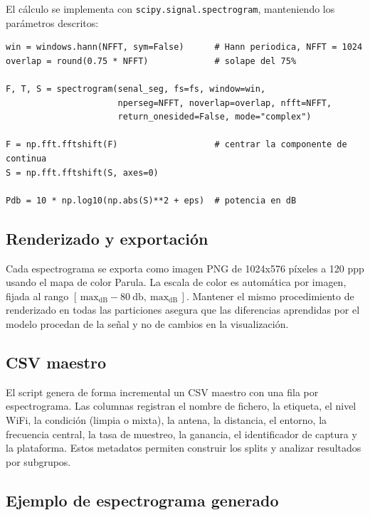 El cálculo se implementa con \texttt{scipy.signal.spectrogram}, manteniendo los parámetros descritos:

\begin{lstlisting}[style=python,caption={Cálculo de la STFT de cada segmento.}]
win = windows.hann(NFFT, sym=False)      # Hann periodica, NFFT = 1024
overlap = round(0.75 * NFFT)             # solape del 75%

F, T, S = spectrogram(senal_seg, fs=fs, window=win,
                      nperseg=NFFT, noverlap=overlap, nfft=NFFT,
                      return_onesided=False, mode="complex")

F = np.fft.fftshift(F)                   # centrar la componente de continua
S = np.fft.fftshift(S, axes=0)

Pdb = 10 * np.log10(np.abs(S)**2 + eps)  # potencia en dB
\end{lstlisting}


\subsection{Renderizado y exportación}

Cada espectrograma se exporta como imagen PNG de \num{1024}x\num{576} píxeles a \num{120} ppp usando el mapa de color Parula. La escala de color es automática por imagen, fijada al rango $[\,\text{max}_{\mathrm{dB}} - \SI{80}{\decibel},\ \text{max}_{\mathrm{dB}}\,]$. Mantener el mismo procedimiento de renderizado en todas las particiones asegura que las diferencias aprendidas por el modelo procedan de la señal y no de cambios en la visualización.




\subsection{CSV maestro}

El script genera de forma incremental un CSV maestro con una fila por espectrograma. Las columnas registran el nombre de fichero, la etiqueta, el nivel WiFi, la condición (limpia o mixta), la antena, la distancia, el entorno, la frecuencia central, la tasa de muestreo, la ganancia, el identificador de captura y la plataforma. Estos metadatos permiten construir los splits y analizar resultados por subgrupos.


\subsection{Ejemplo de espectrograma generado}
\label{sec:ejemplo_espectrograma}

